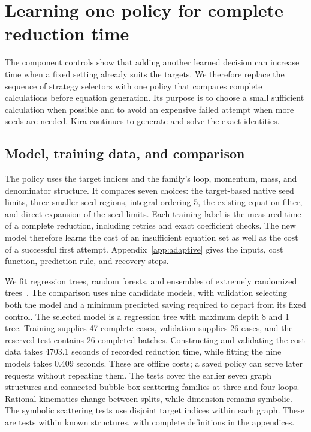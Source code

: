 \section{Learning one policy for complete reduction time}
\label{sec:adaptive}
The component controls show that adding another learned decision can increase time when a fixed setting already suits the targets. We therefore replace the sequence of strategy selectors with one policy that compares complete calculations before equation generation. Its purpose is to choose a small sufficient calculation when possible and to avoid an expensive failed attempt when more seeds are needed. Kira continues to generate and solve the exact identities.

\subsection{Model, training data, and comparison}
The policy uses the target indices and the family's loop, momentum, mass, and denominator structure. It compares seven choices: the target-based native seed limits, three smaller seed regions, integral ordering 5, the existing equation filter, and direct expansion of the seed limits. Each training label is the measured time of a complete reduction, including retries and exact coefficient checks. The new model therefore learns the cost of an insufficient equation set as well as the cost of a successful first attempt. Appendix~\ref{app:adaptive} gives the inputs, cost function, prediction rule, and recovery steps.

We fit regression trees, random forests, and ensembles of extremely randomized trees~\cite{CART1984,Breiman2001Forest,Geurts2006ExtraTrees}. The comparison uses nine candidate models, with validation selecting both the model and a minimum predicted saving required to depart from its fixed control. The selected model is a regression tree with maximum depth 8 and 1 tree. Training supplies 47 complete cases, validation supplies 26 cases, and the reserved test contains 26 completed batches. Constructing and validating the cost data takes 4703.1 seconds of recorded reduction time, while fitting the nine models takes 0.409 seconds. These are offline costs; a saved policy can serve later requests without repeating them. The tests cover the earlier seven graph structures and connected bubble-box scattering families at three and four loops. Rational kinematics change between splits, while dimension remains symbolic. The symbolic scattering tests use disjoint target indices within each graph. These are tests within known structures, with complete definitions in the appendices.

